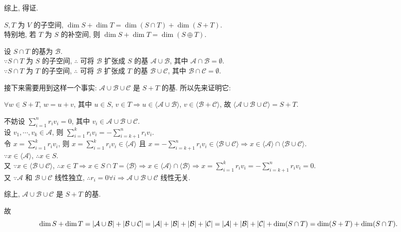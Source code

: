 \documentclass{note}
\begin{document}
\begin{pf}
\begin{itemize}
        综上, 得证.
    \end{itemize}
\end{pf}

\begin{thm}[(课本定理 1.14)]
    $S,T$ 为 $V$ 的子空间, $\dim S+\dim T=\dim(S\cap T)+\dim(S+T)$.\\
    特别地, 若 $T$ 为 $S$ 的补空间, 则 $\dim S+\dim T=\dim(S\oplus T)$.
\end{thm}
\begin{pf}
    设 $S\cap T$ 的基为 $\mathcal{B}$.\\
    $\because S\cap T$ 为 $S$ 的子空间, $\therefore$ 可将 $\mathcal{B}$ 扩张成 $S$ 的基 $\mathcal{A}\cup\mathcal{B}$, 其中 $\mathcal{A}\cap\mathcal{B}=\emptyset$.\\
    $\because S\cap T$ 为 $T$ 的子空间, $\therefore$ 可将 $\mathcal{B}$ 扩张成 $T$ 的基 $\mathcal{B}\cup\mathcal{C}$, 其中 $\mathcal{B}\cap\mathcal{C}=\emptyset$.

    接下来需要用到这样一个事实: $\mathcal{A}\cup\mathcal{B}\cup\mathcal{C}$ 是 $S+T$ 的基. 所以先来证明它:
    \begin{pf}
        $\forall w\in S+T$, $w=u+v$, 其中 $u\in S$, $v\in T\Longrightarrow u\in \langle\mathcal{A}\cup\mathcal{B}\rangle$, $v\in\langle\mathcal{B}+\mathcal{C}\rangle$, 故 $\langle\mathcal{A}\cup\mathcal{B}\cup\mathcal{C}\rangle=S+T$.

        不妨设 $\sum_{i=1}^nr_iv_i=0$, 其中 $v_i\in\mathcal{A}\cup\mathcal{B}\cup\mathcal{C}$.\\
        设 $v_1,\cdots,v_k\in\mathcal{A}$, 则 $\sum_{i=1}^kr_iv_i=-\sum_{i=k+1}^nr_iv_i$.\\
        令 $x=\sum_{i=1}^kr_iv_i$, 则 $x=\sum_{i=1}^kr_iv_i\in\langle\mathcal{A}\rangle$ 且 $x=-\sum_{i=k+1}^nr_iv_i\in\langle\mathcal{B}\cup\mathcal{C}\rangle\Longrightarrow x\in\langle\mathcal{A}\rangle\cap\langle\mathcal{B}\cup\mathcal{C}\rangle$.\\
        $\because x\in\langle\mathcal{A}\rangle$, $\therefore x\in S$.\\
        又 $\because x\in \langle\mathcal{B}\cup\mathcal{C}\rangle$, $\therefore x\in T\Longrightarrow x\in S\cap T=\langle\mathcal{B}\rangle\Longrightarrow x\in\langle\mathcal{A}\rangle\cap\langle\mathcal{B}\rangle\Longrightarrow x=\sum_{i=1}^kr_iv_i=-\sum_{i=k+1}^nr_iv_i=0$.\\
        又 $\because\mathcal{A}$ 和 $\mathcal{B}\cup\mathcal{C}$ 线性独立, $\therefore r_i=0\forall i\Longrightarrow\mathcal{A}\cup\mathcal{B}\cup\mathcal{C}$ 线性无关.

        综上, $\mathcal{A}\cup\mathcal{B}\cup\mathcal{C}$ 是 $S+T$ 的基.
    \end{pf}

    故 $$\dim S+\dim T=\left\lvert\mathcal{A}\cup\mathcal{B}\right\rvert+\left\lvert\mathcal{B}\cup\mathcal{C}\right\rvert=\left\lvert\mathcal{A}\right\rvert+\left\lvert\mathcal{B}\right\rvert+\left\lvert\mathcal{B}\right\rvert+\left\lvert\mathcal{C}\right\rvert=\left\lvert\mathcal{A}\right\rvert+\left\lvert\mathcal{B}\right\rvert+\left\lvert\mathcal{C}\right\rvert+\dim(S\cap T)=\dim(S+T)+\dim(S\cap T).$$
\end{pf}
\ifx\allfiles\undefined
\end{document}
